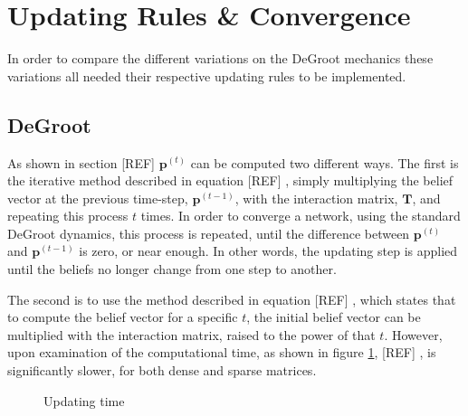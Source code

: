 \documentclass{article}
\newcommand{\T}{\textbf{T}}
\begin{document}
\section{Updating Rules \& Convergence}

In order to compare the different variations on the DeGroot mechanics these variations all needed their respective updating rules to be implemented.

\subsection{DeGroot}

As shown in section [REF] $\textbf{p}^{(t)}$ can be computed two different ways. The first is the iterative method described in equation [REF] , simply multiplying the belief vector at the previous time-step, $\textbf{p}^{(t-1)}$, with the interaction matrix, $\T$, and repeating this process $t$ times. In order to converge a network, using the standard DeGroot dynamics, this process is repeated, until the difference between $\textbf{p}^{(t)}$ and $\textbf{p}^{(t-1)}$ is zero, or near enough. In other words, the updating step is applied until the beliefs no longer change from one step to another.

The second is to use the method described in equation [REF] , which states that to compute the belief vector for a specific $t$, the initial belief vector can be multiplied with the interaction matrix, raised to the power of that $t$. However, upon examination of the computational time, as shown in figure \ref{update:time}, [REF] , is significantly slower, for both dense and sparse matrices.
\begin{figure}[!htbp]%
    \centering
    \qquad
    \caption{Updating time}%
    \label{update:time}%
\end{figure}
\end{document}
